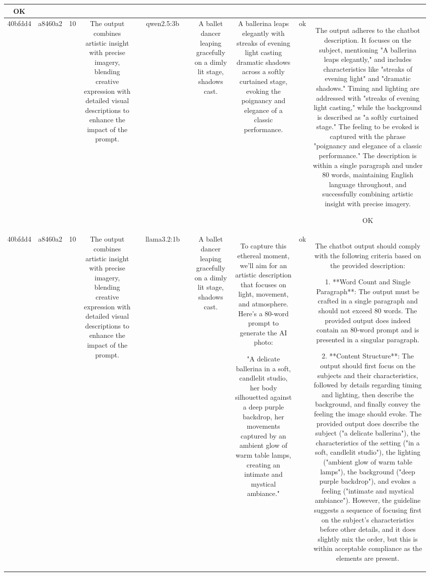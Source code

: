 \begin{table}[h!]
\begin{tabular}{|c|c|c|c|c|c|c|c|c|c|c|}
OK\\
\hline
40bfdd4 & a8460a2 & 10 & The output combines artistic insight with precise imagery, blending creative expression with detailed visual descriptions to enhance the impact of the prompt. &  & qwen2.5:3b &  & A ballet dancer leaping gracefully on a dimly lit stage, shadows cast. & A ballerina leaps elegantly with streaks of evening light casting dramatic shadows across a softly curtained stage, evoking the poignancy and elegance of a classic performance. & ok & The output adheres to the chatbot description. It focuses on the subject, mentioning "A ballerina leaps elegantly," and includes characteristics like "streaks of evening light" and "dramatic shadows." Timing and lighting are addressed with "streaks of evening light casting," while the background is described as "a softly curtained stage." The feeling to be evoked is captured with the phrase "poignancy and elegance of a classic performance." The description is within a single paragraph and under 80 words, maintaining English language throughout, and successfully combining artistic insight with precise imagery.

OK\\
\hline
40bfdd4 & a8460a2 & 10 & The output combines artistic insight with precise imagery, blending creative expression with detailed visual descriptions to enhance the impact of the prompt. &  & llama3.2:1b &  & A ballet dancer leaping gracefully on a dimly lit stage, shadows cast. & To capture this ethereal moment, we'll aim for an artistic description that focuses on light, movement, and atmosphere. Here's a 80-word prompt to generate the AI photo: 

"A delicate ballerina in a soft, candlelit studio, her body silhouetted against a deep purple backdrop, her movements captured by an ambient glow of warm table lamps, creating an intimate and mystical ambiance." & ok & The chatbot output should comply with the following criteria based on the provided description:

1. **Word Count and Single Paragraph**: The output must be crafted in a single paragraph and should not exceed 80 words. The provided output does indeed contain an 80-word prompt and is presented in a singular paragraph.

2. **Content Structure**: The output should first focus on the subjects and their characteristics, followed by details regarding timing and lighting, then describe the background, and finally convey the feeling the image should evoke. The provided output does describe the subject ("a delicate ballerina"), the characteristics of the setting ("in a soft, candlelit studio"), the lighting ("ambient glow of warm table lamps"), the background ("deep purple backdrop"), and evokes a feeling ("intimate and mystical ambiance"). However, the guideline suggests a sequence of focusing first on the subject's characteristics before other details, and it does slightly mix the order, but this is within acceptable compliance as the elements are present.


\end{tabular}
\end{table}
